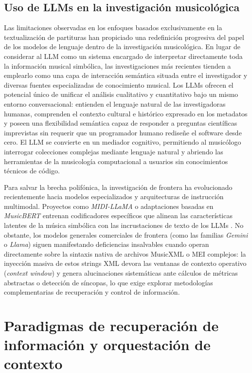 \subsection{Uso de LLMs en la investigación musicológica}
Las limitaciones observadas en los enfoques basados exclusivamente en la textualización de partituras han propiciado una redefinición progresiva del papel de los modelos de lenguaje dentro de la investigación musicológica. En lugar de considerar al LLM como un sistema encargado de interpretar directamente toda la información musical simbólica, las investigaciones más recientes tienden a emplearlo como una capa de interacción semántica situada entre el investigador y diversas fuentes especializadas de conocimiento musical. Los LLMs ofrecen el potencial único de unificar el análisis cualitativo y cuantitativo bajo un mismo entorno conversacional: entienden el lenguaje natural de las investigadoras humanas, comprenden el contexto cultural e histórico expresado en los metadatos y poseen una flexibilidad semántica capaz de responder a preguntas científicas imprevistas sin requerir que un programador humano rediseñe el software desde cero. El LLM se convierte en un mediador cognitivo, permitiendo al musicólogo interrogar colecciones complejas mediante lenguaje natural y abriendo las herramientas de la musicología computacional a usuarios sin conocimientos técnicos de código.

Para salvar la brecha polifónica, la investigación de frontera ha evolucionado recientemente hacia modelos especializados y arquitecturas de instrucción multimodal. Proyectos como \textit{MIDI-LLaMA} o adaptaciones basadas en \textit{MusicBERT} entrenan codificadores específicos que alinean las características latentes de la música simbólica con las incrustaciones de texto de los LLMs \citep{chou2024midillama, zeng2021musicbert}. No obstante, los modelos generales comerciales de frontera (como las familias \textit{Gemini} o \textit{Llama}) siguen manifestando deficiencias insalvables cuando operan directamente sobre la sintaxis nativa de archivos MusicXML o MEI complejos: la inyección masiva de estos strings XML devora las ventanas de contexto operativo (\textit{context window}) y genera alucinaciones sistemáticas ante cálculos de métricas abstractas o detección de síncopas, lo que exige explorar metodologías complementarias de recuperación y control de información.

\section{Paradigmas de recuperación de información y orquestación de contexto}
\label{sec:paradigmas_recuperacion}

